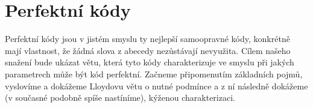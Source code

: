 \documentclass[a4paper,12pt,titlepage]{article}
\begin{document}





\section{Perfektní kódy}

Perfektní kódy jsou v jistém smyslu ty nejlepší samoopravné kódy, konkrétně mají vlastnost, že žádná slova z abecedy nezůstávají nevyužita. Cílem našeho snažení bude ukázat větu, která tyto kódy charakterizuje ve smyslu při jakých parametrech může být kód perfektní. Začneme připomenutím základních pojmů, vyslovíme a dokážeme Lloydovu větu o nutné podmínce a z ní následně dokážeme (v současné podobně spíše nastíníme), kýženou charakterizaci.








\end{document}
